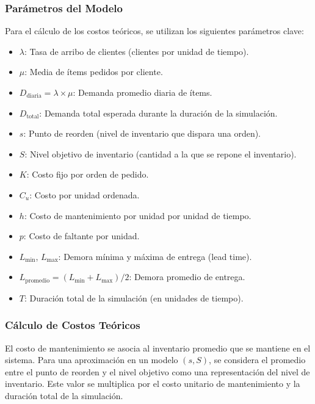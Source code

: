 \documentclass{article}
\begin{document}
\subsubsection{Parámetros del Modelo}
Para el cálculo de los costos teóricos, se utilizan los siguientes parámetros clave:
\begin{itemize}
    \item $\lambda$: Tasa de arribo de clientes (clientes por unidad de tiempo).
    \item $\mu$: Media de ítems pedidos por cliente.
    \item $D_{\text{diaria}} = \lambda \times \mu$: Demanda promedio diaria de ítems.
    \item $D_{\text{total}}$: Demanda total esperada durante la duración de la simulación.
    \item $s$: Punto de reorden (nivel de inventario que dispara una orden).
    \item $S$: Nivel objetivo de inventario (cantidad a la que se repone el inventario).
    \item $K$: Costo fijo por orden de pedido.
    \item $C_u$: Costo por unidad ordenada.
    \item $h$: Costo de mantenimiento por unidad por unidad de tiempo.
    \item $p$: Costo de faltante por unidad.
    \item $L_{\text{min}}$, $L_{\text{max}}$: Demora mínima y máxima de entrega (lead time).
    \item $L_{\text{promedio}} = (L_{\text{min}} + L_{\text{max}}) / 2$: Demora promedio de entrega.
    \item $T$: Duración total de la simulación (en unidades de tiempo).
\end{itemize}


\subsubsection{Cálculo de Costos Teóricos}


El costo de mantenimiento se asocia al inventario promedio que se mantiene en el sistema. Para una aproximación en un modelo $(s,S)$, se considera el promedio entre el punto de reorden y el nivel objetivo como una representación del nivel de inventario. Este valor se multiplica por el costo unitario de mantenimiento y la duración total de la simulación.
\end{document}
